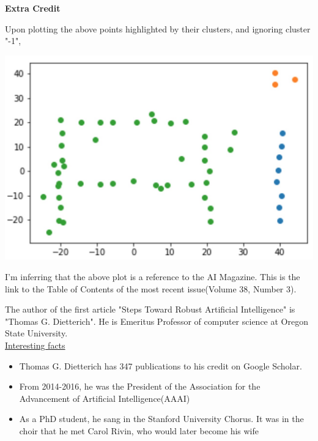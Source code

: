 \documentclass[11pt]{article}
\begin{document}
\vspace{5mm}	
\textbf{Extra Credit}

Upon plotting the above points highlighted by their clusters, and ignoring cluster "-1",

\begin{center}
	\includegraphics[scale=0.2]{ec_plot}
\end{center}

I'm inferring that the above plot is a reference to the AI Magazine. This is the link to the Table of Contents of the most recent issue(Volume 38, Number 3).

The author of the first article "Steps Toward Robust Artificial Intelligence" is "Thomas G. Dietterich". He is  Emeritus Professor of computer science at Oregon State University. \\

\underline{Interesting facts}
\begin{itemize}
	\item Thomas G. Dietterich has 347 publications to his credit on Google Scholar.
	\item From 2014-2016, he was the President of the Association for the Advancement of Artificial Intelligence(AAAI)
	\item As a PhD student, he sang in the Stanford University Chorus. It was in the choir that he met Carol Rivin, who would later become his wife
\end{itemize}
\newpage
\end{document}
